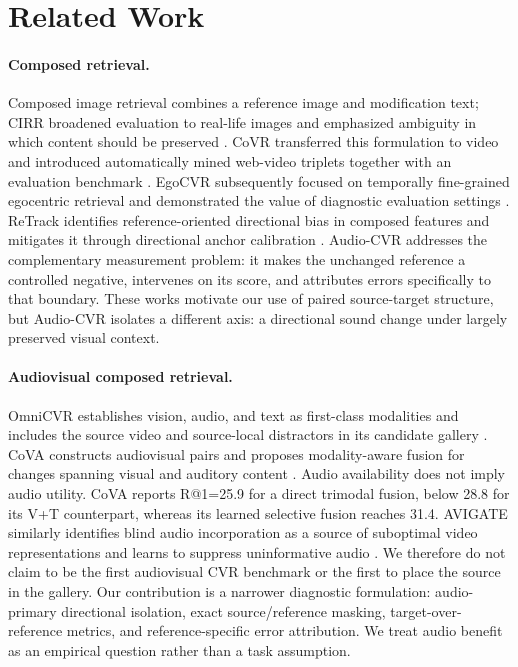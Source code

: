 \documentclass[letterpaper]{article}
\begin{document}
\section{Related Work}

\paragraph{Composed retrieval.}
Composed image retrieval combines a reference image and modification text; CIRR broadened evaluation to real-life images and emphasized ambiguity in which content should be preserved \cite{liu2021cirr}.
CoVR transferred this formulation to video and introduced automatically mined web-video triplets together with an evaluation benchmark \cite{ventura2024covr2,ventura2024covr}.
EgoCVR subsequently focused on temporally fine-grained egocentric retrieval and demonstrated the value of diagnostic evaluation settings \cite{hummel2024egocvr}.
ReTrack identifies reference-oriented directional bias in composed features and mitigates it through directional anchor calibration \cite{li2026retrack}.
Audio-CVR addresses the complementary measurement problem: it makes the unchanged reference a controlled negative, intervenes on its score, and attributes errors specifically to that boundary.
These works motivate our use of paired source-target structure, but Audio-CVR isolates a different axis: a directional sound change under largely preserved visual context.

\paragraph{Audiovisual composed retrieval.}
OmniCVR establishes vision, audio, and text as first-class modalities and includes the source video and source-local distractors in its candidate gallery \cite{ji2026omnicvr}.
CoVA constructs audiovisual pairs and proposes modality-aware fusion for changes spanning visual and auditory content \cite{han2026cova}.
Audio availability does not imply audio utility.
CoVA reports R@1=25.9 for a direct trimodal fusion, below 28.8 for its V+T counterpart, whereas its learned selective fusion reaches 31.4.
AVIGATE similarly identifies blind audio incorporation as a source of suboptimal video representations and learns to suppress uninformative audio \cite{jeong2025avigate}.
We therefore do not claim to be the first audiovisual CVR benchmark or the first to place the source in the gallery.
Our contribution is a narrower diagnostic formulation: audio-primary directional isolation, exact source/reference masking, target-over-reference metrics, and reference-specific error attribution.
We treat audio benefit as an empirical question rather than a task assumption.
\end{document}
